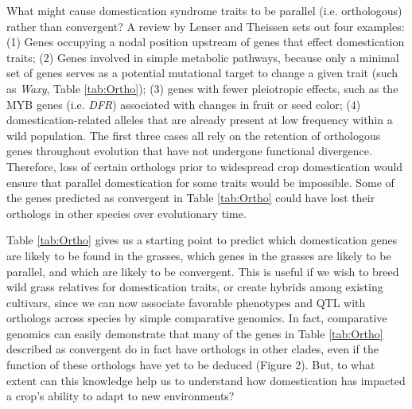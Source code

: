 \documentclass[12pt]{article}
\begin{document}
What might cause domestication syndrome traits to be parallel (i.e. orthologous) rather than convergent?
A review by Lenser and Theissen \citep{Lenser2013} sets out four examples: (1) Genes occupying a nodal position upstream of genes that effect domestication traits; (2) Genes involved in simple metabolic pathways, because only a minimal set of genes serves as a potential mutational target to change a given trait (such as \textit{Waxy}, Table \ref{tab:Ortho}); (3) genes with fewer pleiotropic effects, such as the MYB genes (i.e. \textit{DFR}) associated with changes in fruit or seed color; (4) domestication-related alleles that are already present at low frequency within a wild population. 
The first three cases all rely on the retention of orthologous genes throughout evolution that have not undergone functional divergence.
Therefore, loss of certain orthologs prior to widespread crop domestication would ensure that parallel domestication for some traits would be impossible.
Some of the genes predicted as convergent in Table \ref{tab:Ortho} could have lost their orthologs in other species over evolutionary time.

Table \ref{tab:Ortho} gives us a starting point to predict which domestication genes are likely to be found in the grasses, which genes in the grasses are likely to be parallel, and which are likely to be convergent.
This is useful if we wish to breed wild grass relatives for domestication traits, or create hybrids among existing cultivars, since we can now associate favorable phenotypes and QTL with orthologs across species by simple comparative genomics.
In fact, comparative genomics can easily demonstrate that many of the genes in Table \ref{tab:Ortho} described as convergent do in fact have orthologs in other clades, even if the function of these orthologs have yet to be deduced (Figure 2).
But, to what extent can this knowledge help us to understand how domestication has impacted a crop's ability to adapt to new environments?
\paragraph{}
\end{document}
